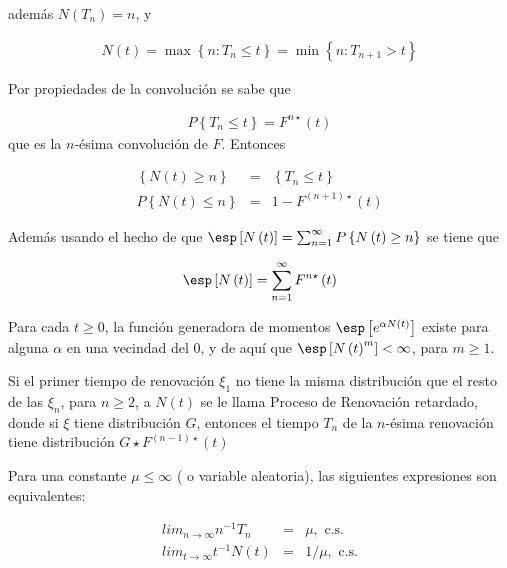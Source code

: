 adem\'as $N\left(T_{n}\right)=n$, y 

\begin{eqnarray*}
N\left(t\right)=\max\left\{n:T_{n}\leq t\right\}=\min\left\{n:T_{n+1}>t\right\}
\end{eqnarray*}

Por propiedades de la convoluci\'on se sabe que

\begin{eqnarray*}
P\left\{T_{n}\leq t\right\}=F^{n\star}\left(t\right)
\end{eqnarray*}
que es la $n$-\'esima convoluci\'on de $F$. Entonces 

\begin{eqnarray*}
\left\{N\left(t\right)\geq n\right\}&=&\left\{T_{n}\leq t\right\}\\
P\left\{N\left(t\right)\leq n\right\}&=&1-F^{\left(n+1\right)\star}\left(t\right)
\end{eqnarray*}

Adem\'as usando el hecho de que $\esp\left[N\left(t\right)\right]=\sum_{n=1}^{\infty}P\left\{N\left(t\right)\geq n\right\}$
se tiene que

\begin{eqnarray*}
\esp\left[N\left(t\right)\right]=\sum_{n=1}^{\infty}F^{n\star}\left(t\right)
\end{eqnarray*}

\begin{Prop}
Para cada $t\geq0$, la funci\'on generadora de momentos $\esp\left[e^{\alpha N\left(t\right)}\right]$ existe para alguna $\alpha$ en una vecindad del 0, y de aqu\'i que $\esp\left[N\left(t\right)^{m}\right]<\infty$, para $m\geq1$.
\end{Prop}


\begin{Note}
Si el primer tiempo de renovaci\'on $\xi_{1}$ no tiene la misma distribuci\'on que el resto de las $\xi_{n}$, para $n\geq2$, a $N\left(t\right)$ se le llama Proceso de Renovaci\'on retardado, donde si $\xi$ tiene distribuci\'on $G$, entonces el tiempo $T_{n}$ de la $n$-\'esima renovaci\'on tiene distribuci\'on $G\star F^{\left(n-1\right)\star}\left(t\right)$
\end{Note}


\begin{Teo}
Para una constante $\mu\leq\infty$ ( o variable aleatoria), las siguientes expresiones son equivalentes:

\begin{eqnarray}
lim_{n\rightarrow\infty}n^{-1}T_{n}&=&\mu,\textrm{ c.s.}\\
lim_{t\rightarrow\infty}t^{-1}N\left(t\right)&=&1/\mu,\textrm{ c.s.}
\end{eqnarray}
\end{Teo}


